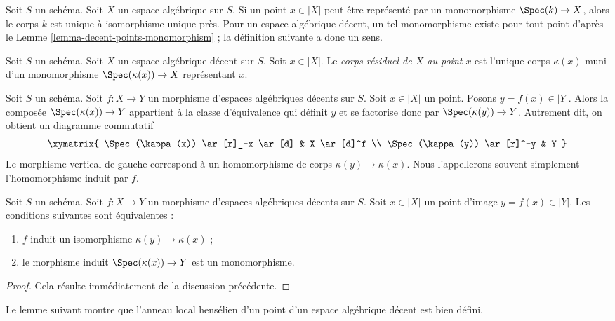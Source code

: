 \noindent
Soit $S$ un schéma. Soit $X$ un espace algébrique sur $S$.
Si un point $x \in |X|$ peut être représenté par un monomorphisme
$\Spec(k) \to X$, alors le corps $k$ est unique à isomorphisme unique près.
Pour un espace algébrique décent, un tel monomorphisme existe pour tout point
d'après le Lemme \ref{lemma-decent-points-monomorphism} ; la définition
suivante a donc un sens.

\begin{definition}
\label{definition-residue-field}
Soit $S$ un schéma. Soit $X$ un espace algébrique décent sur $S$.
Soit $x \in |X|$. Le {\it corps résiduel de $X$ au point $x$}
est l'unique corps $\kappa(x)$ muni d'un
monomorphisme $\Spec(\kappa(x)) \to X$ représentant $x$.
\end{definition}

\noindent
Soit $S$ un schéma. Soit $f : X \to Y$ un morphisme d'espaces algébriques
décents sur $S$. Soit $x \in |X|$ un point.
Posons $y = f(x) \in |Y|$. Alors la composée $\Spec(\kappa(x)) \to Y$
appartient à la classe d'équivalence qui définit $y$ et se factorise donc par
$\Spec(\kappa(y)) \to Y$. Autrement dit, on obtient un diagramme commutatif
$$
\xymatrix{
\Spec(\kappa(x)) \ar[r]_-x \ar[d] & X \ar[d]^f \\
\Spec(\kappa(y)) \ar[r]^-y & Y
}
$$
Le morphisme vertical de gauche correspond à un homomorphisme de corps
$\kappa(y) \to \kappa(x)$. Nous l'appellerons souvent simplement
l'homomorphisme induit par $f$.

\begin{lemma}
\label{lemma-identifies-residue-fields}
Soit $S$ un schéma. Soit $f : X \to Y$ un morphisme d'espaces algébriques
décents sur $S$. Soit $x \in |X|$ un point
d'image $y = f(x) \in |Y|$.
Les conditions suivantes sont équivalentes :
\begin{enumerate}
\item $f$ induit un isomorphisme $\kappa(y) \to \kappa(x)$ ;
\item le morphisme induit $\Spec(\kappa(x)) \to Y$ est un monomorphisme.
\end{enumerate}
\end{lemma}

\begin{proof}
Cela résulte immédiatement de la discussion précédente.
\end{proof}

\noindent
Le lemme suivant montre que l'anneau local hensélien d'un point
d'un espace algébrique décent est bien défini.

